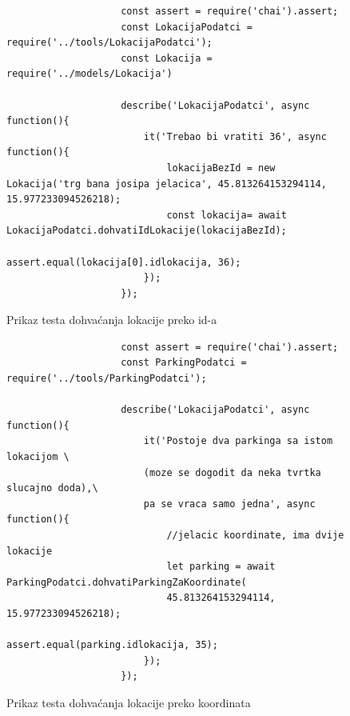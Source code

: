 	


			\begin{figure}[H]
				\begin{lstlisting}
					const assert = require('chai').assert;
					const LokacijaPodatci = require('../tools/LokacijaPodatci');
					const Lokacija = require('../models/Lokacija')
					
					describe('LokacijaPodatci', async function(){
						it('Trebao bi vratiti 36', async function(){
							lokacijaBezId = new Lokacija('trg bana josipa jelacica', 45.813264153294114, 15.977233094526218);
							const lokacija= await LokacijaPodatci.dohvatiIdLokacije(lokacijaBezId);
							assert.equal(lokacija[0].idlokacija, 36);
						});
					});
				\end{lstlisting}
			
				\centering
				\caption{Prikaz testa dohvaćanja lokacije preko id-a}
				\label{fig:test - user - dohvaćanje lokacije preko id-a}
			\end{figure}
				
			\begin{figure}[H]
				
				\begin{lstlisting}
					const assert = require('chai').assert;
					const ParkingPodatci = require('../tools/ParkingPodatci');
					
					describe('LokacijaPodatci', async function(){
						it('Postoje dva parkinga sa istom lokacijom \
						(moze se dogodit da neka tvrtka slucajno doda),\
						pa se vraca samo jedna', async function(){
							//jelacic koordinate, ima dvije lokacije
							let parking = await ParkingPodatci.dohvatiParkingZaKoordinate(
							45.813264153294114, 15.977233094526218);
							assert.equal(parking.idlokacija, 35);
						});
					});
				\end{lstlisting}
				
				\centering
				\caption{Prikaz testa dohvaćanja lokacije preko koordinata}
				\label{fig:test - user - dohvaćanje lokacije preko koordinata}
			\end{figure}
				
